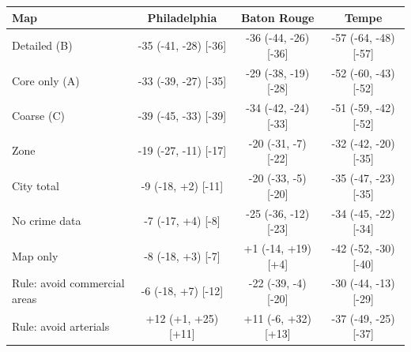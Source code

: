 \begin{tabular}{lccc}
\toprule
Map & Philadelphia & Baton Rouge & Tempe \\
\midrule
Detailed (B) & -35 (-41, -28) [-36] & -36 (-44, -26) [-36] & -57 (-64, -48) [-57] \\
Core only (A) & -33 (-39, -27) [-35] & -29 (-38, -19) [-28] & -52 (-60, -43) [-52] \\
Coarse (C) & -39 (-45, -33) [-39] & -34 (-42, -24) [-33] & -51 (-59, -42) [-52] \\
Zone & -19 (-27, -11) [-17] & -20 (-31, -7) [-22] & -32 (-42, -20) [-35] \\
City total & -9 (-18, +2) [-11] & -20 (-33, -5) [-20] & -35 (-47, -23) [-35] \\
No crime data & -7 (-17, +4) [-8] & -25 (-36, -12) [-23] & -34 (-45, -22) [-34] \\
Map only & -8 (-18, +3) [-7] & +1 (-14, +19) [+4] & -42 (-52, -30) [-40] \\
Rule: avoid commercial areas & -6 (-18, +7) [-12] & -22 (-39, -4) [-20] & -30 (-44, -13) [-29] \\
Rule: avoid arterials & +12 (+1, +25) [+11] & +11 (-6, +32) [+13] & -37 (-49, -25) [-37] \\
\bottomrule
\end{tabular}
